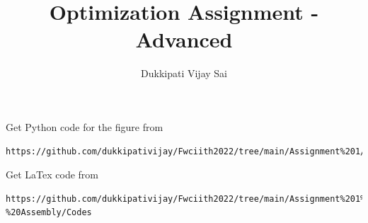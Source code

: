 \documentclass[journal,12pt,twocolumn]{IEEEtran}
\begin{document}
\makeatother
\let\StandardTheFigure\thefigure
\let\vec\mathbf
\renewcommand{\thefigure}{\theproblem}
\def\putbox#1#2#3{\makebox[0in][l]{\makebox[#1][l]{}\raisebox{\baselineskip}[0in][0in]{\raisebox{#2}[0in][0in]{#3}}}}
     \def\rightbox#1{\makebox[0in][r]{#1}}
     \def\centbox#1{\makebox[0in]{#1}}
     \def\topbox#1{\raisebox{-\baselineskip}[0in][0in]{#1}}
     \def\midbox#1{\raisebox{-0.5\baselineskip}[0in][0in]{#1}}
\vspace{3cm}
\title{\textbf{Optimization Assignment - Advanced} }
\author{Dukkipati Vijay Sai}
\maketitle
\newpage
\bigskip
\renewcommand{\thefigure}{\theenumi}
\renewcommand{\thetable}{\theenumi}
Get Python code for the figure from 
\begin{lstlisting}
https://github.com/dukkipativijay/Fwciith2022/tree/main/Assignment%201/Codes/src
\end{lstlisting}
Get LaTex code from
\begin{lstlisting}
https://github.com/dukkipativijay/Fwciith2022/tree/main/Assignment%201%20-%20Assembly/Codes
\end{lstlisting}
%
\end{document}
